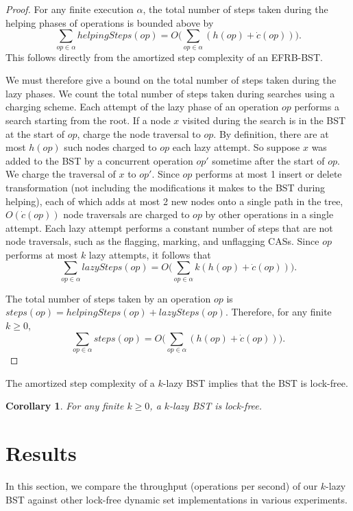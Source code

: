 \documentclass[letterpaper,twocolumn]{article}
\newtheorem{corollary}[theorem]{Corollary}
\begin{document}
\begin{proof}
For any finite execution $\alpha$, the total number of steps taken during the helping phases of operations is bounded above by
\begin{equation*}
\sum_{op\in\alpha} helpingSteps(op) = O\bigg(\sum_{op\in\alpha} (h(op) + \dot{c}(op))\bigg).
\end{equation*}
This follows directly from the amortized step complexity of an EFRB-BST. 

We must therefore give a bound on the total number of steps taken during the lazy phases. We count the total number of steps taken during searches using a charging scheme.  Each attempt of the lazy phase of an operation $op$ performs a search starting from the root. If a node $x$ visited during the search is in the BST at the start of $op$, charge the node traversal to $op$. By definition, there are at most $h(op)$ such nodes charged to $op$ each lazy attempt. So suppose $x$ was added to the BST by a concurrent operation $op'$ sometime after the start of $op$. We charge the traversal of $x$ to $op'$. Since $op$ performs at most 1 insert or delete transformation (not including the modifications it makes to the BST during helping), each of which adds at most 2 new nodes onto a single path in the tree, $O(\dot{c}(op))$ node traversals are charged to $op$ by other operations in a single attempt. Each lazy attempt performs a constant number of steps that are not node traversals, such as the flagging, marking, and unflagging CASs. Since $op$ performs at most $k$ lazy attempts, it follows that
\begin{equation*}
\sum_{op\in\alpha} lazySteps(op) = O\bigg(\sum_{op\in\alpha} k(h(op) + \dot{c}(op))\bigg).
\end{equation*}

The total number of steps taken by an operation $op$ is $steps(op) = helpingSteps(op) + lazySteps(op)$. Therefore, for any finite $k \geq 0$,
\begin{equation*}
\sum_{op\in\alpha} steps(op) = O\bigg(\sum_{op\in\alpha} (h(op) + \dot{c}(op))\bigg).
\end{equation*}
\end{proof}

The amortized step complexity of a $k$-lazy BST implies that the BST is lock-free.
\begin{corollary}
For any finite $k \geq 0$, a $k$-lazy BST is lock-free.
\end{corollary}

\section{Results}\label{section_results}
In this section, we compare the throughput (operations per second) of our $k$-lazy BST against other lock-free dynamic set implementations in various experiments.
\end{document}
